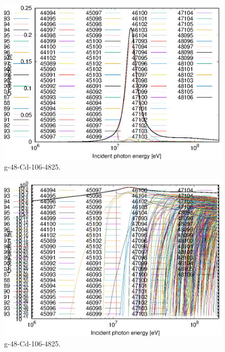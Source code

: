 \begin{figure}
 \includegraphics[width=\linewidth]{eps/g_48-Cd-106_4825.eps}
  \caption{g-48-Cd-106-4825.}
\end{figure}
\begin{figure}
 \includegraphics[width=\linewidth]{eps-log/g_48-Cd-106_4825.eps}
 \caption{g-48-Cd-106-4825.}
\end{figure}
\newpage \clearpage

